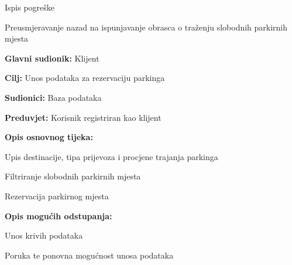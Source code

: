 \begin{packed_item}
\begin{packed_item}
\begin{packed_item}
\begin{packed_enum}
    							\item Ispis pogreške
    							\item Preusmjeravanje nazad na ispunjavanje obrasca o traženju slobodnih parkirnih mjesta
    							
    						\end{packed_enum}
    						
    						
    					\end{packed_item}
    				\end{packed_item}
    				\noindent {}
    				\begin{packed_item}
    					
    					\item \textbf{Glavni sudionik: } Klijent
    					\item  \textbf{Cilj:} Unos podataka za rezervaciju parkinga
    					\item  \textbf{Sudionici:} Baza podataka
    					\item  \textbf{Preduvjet:} Korisnik registriran kao klijent
    					\item  \textbf{Opis osnovnog tijeka:}
    					
    					\item[] \begin{packed_enum}
    						
    						\item Upis destinacije, tipa prijevoza i procjene trajanja parkinga
    						\item Filtriranje slobodnih parkirnih mjesta
    						\item Rezervacija parkirnog mjesta

    					\end{packed_enum}
    					
    					\item  \textbf{Opis mogućih odstupanja:}
    					
    					\item[] \begin{packed_item}
    						
    						\item[2.a] Unos krivih podataka
    						\item[] \begin{packed_enum}
    							
    							\item Poruka te ponovna mogućnost unosa podataka
    					

\end{packed_enum}
\end{packed_item}
\end{packed_item}
\end{packed_item}
